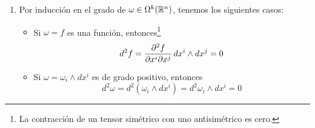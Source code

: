 \begin{solution}
\begin{enumerate}[label=\alph*)]
    \item Por inducción en el grado de $\omega \in \Omega^k(\mathbb R^n)$, tenemos los siguientes casos:
    \begin{itemize}
        \item Si $\omega = f$ es una función, entonces\footnote{La contracción de un tensor simétrico con uno antisimétrico es cero.}
        $$d^2 f = \frac {\partial^2 f} {\partial x^i \partial x^j} \, dx^i \wedge dx^j = 0$$
        
        \item Si $\omega = \omega_i \wedge dx^i$ es de grado positivo, entonces
        $$d^2 \omega = d^2 (\omega_i \wedge dx^i) = d^2 \omega_i \wedge dx^i = 0$$
    \end{itemize}
\end{enumerate}
\end{solution}
